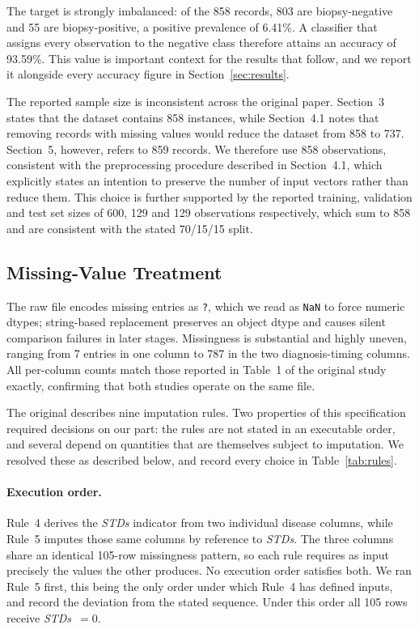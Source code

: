 The target is strongly imbalanced: of the 858 records, 803 are biopsy-negative
and 55 are biopsy-positive, a positive prevalence of 6.41\%. A classifier that
assigns every observation to the negative class therefore attains an accuracy
of 93.59\%. This value is important context for the results that follow, and we
report it alongside every accuracy figure in Section~\ref{sec:results}.

The reported sample size is inconsistent across the original paper. Section~3
states that the dataset contains 858 instances, while Section~4.1 notes that
removing records with missing values would reduce the dataset from 858 to 737.
Section~5, however, refers to 859 records. We therefore use 858 observations,
consistent with the preprocessing procedure described in Section~4.1, which
explicitly states an intention to preserve the number of input vectors rather
than reduce them. This choice is further supported by the reported training,
validation and test set sizes of 600, 129 and 129 observations respectively,
which sum to 858 and are consistent with the stated 70/15/15 split.

\subsection{Missing-Value Treatment}\label{sec:missing}

The raw file encodes missing entries as \texttt{?}, which we read as
\texttt{NaN} to force numeric dtypes; string-based replacement preserves an
object dtype and causes silent comparison failures in later stages. Missingness
is substantial and highly uneven, ranging from 7 entries in one column to 787
in the two diagnosis-timing columns. All per-column counts match those reported
in Table~1 of the original study exactly, confirming that both studies operate
on the same file.

The original describes nine imputation rules. Two properties of this
specification required decisions on our part: the rules are not stated in an
executable order, and several depend on quantities that are themselves subject
to imputation. We resolved these as described below, and record every choice in
Table~\ref{tab:rules}.

\paragraph{Execution order.} Rule~4 derives the \emph{STDs} indicator from two
individual disease columns, while Rule~5 imputes those same columns by
reference to \emph{STDs}. The three columns share an identical 105-row
missingness pattern, so each rule requires as input precisely the values the
other produces. No execution order satisfies both. We ran Rule~5 first, this
being the only order under which Rule~4 has defined inputs, and record the
deviation from the stated sequence. Under this order all 105 rows receive
\emph{STDs}~$=0$.

